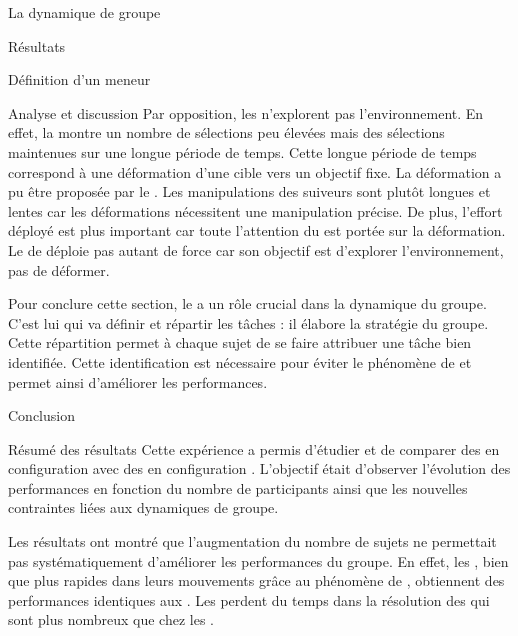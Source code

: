 \documentclass[myfrancais,ngerman,english,french]{mythesis}
\begin{document}
\begin{mychapter}{La dynamique de groupe}
\begin{mysection}{Résultats}
\begin{mysubsection}{Définition d'un meneur}
\begin{mysubsubsection}{Analyse et discussion}
					Par opposition, les  n'explorent pas l'environnement.
					En effet, la  montre un nombre de sélections peu élevées mais des sélections maintenues sur une longue période de temps.
					Cette longue période de temps correspond à une déformation d'une cible vers un objectif fixe.
					La déformation a pu être proposée par le .
					Les manipulations des suiveurs sont plutôt longues et lentes  car les déformations nécessitent une manipulation précise.
					De plus, l'effort déployé est plus important car toute l'attention du  est portée sur la déformation.
					Le  de déploie pas autant de force car son objectif est d'explorer l'environnement, pas de déformer.

					Pour conclure cette section, le  a un rôle crucial dans la dynamique du groupe.
					C'est lui qui va définir et répartir les tâches : il élabore la stratégie du groupe.
					Cette répartition permet à chaque sujet de se faire attribuer une tâche bien identifiée.
					Cette identification est nécessaire pour éviter le phénomène de   et permet ainsi d'améliorer les performances.
				\end{mysubsubsection}
			\end{mysubsection}
		\end{mysection}
		\begin{mysection}{Conclusion}
			\begin{mysubsection}{Résumé des résultats}
				Cette expérience a permis d'étudier et de comparer des  en configuration  avec des  en configuration .
				L'objectif était d'observer l'évolution des performances en fonction du nombre de participants ainsi que les nouvelles contraintes liées aux dynamiques de groupe.

				Les résultats ont montré que l'augmentation du nombre de sujets ne permettait pas systématiquement d'améliorer les performances du groupe.
				En effet, les , bien que plus rapides dans leurs mouvements grâce au phénomène de , obtiennent des performances identiques aux .
				Les  perdent du temps dans la résolution des  qui sont plus nombreux que chez les .


\end{mysubsection}
\end{mysection}
\end{mychapter}
\end{document}
